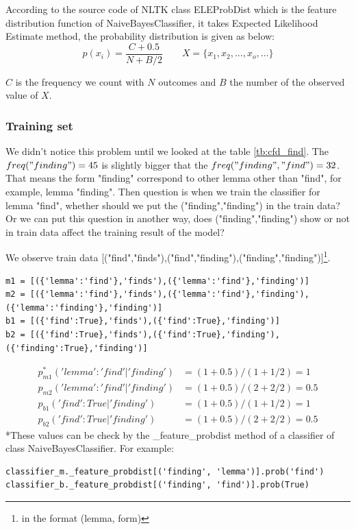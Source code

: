 \documentclass[a4paper]{article}
\begin{document}
According to the source code of NLTK class ELEProbDist which is the feature distribution function of NaiveBayesClassifier, it takes Expected Likelihood Estimate method, the probability distribution is given as below:\cite{loper_nltk.probability_nodate}
\begin{equation}
p(x_i)=\frac{C+0.5}{N+B/2} \qquad X = \{x_1,x_2,\dots,x_o,\dots\}
\end{equation}

$C$ is the frequency we count with $N$ outcomes and $B$ the number of the observed value of $X$. 




\subsubsection{Training set}

We didn't notice this problem until we looked at the table \ref{tb:cfd_find}. The $freq("finding")=45$ is slightly bigger that the $freq("finding","find")=32$. That means the form "finding" correspond to other lemma other than "find", for example, lemma "finding". Then question is when we train the classifier for lemma "find", whether should we put the ("finding","finding") in the train data? Or we can put this question in another way, does ("finding","finding") show or not in train data affect the training result of the model?

We observe train data [("find","finds"),("find","finding"),("finding","finding")]\footnote{in the format (lemma, form)}. 
\begin{lstlisting}
m1 = [({'lemma':'find'},'finds'),({'lemma':'find'},'finding')]
m2 = [({'lemma':'find'},'finds'),({'lemma':'find'},'finding'),({'lemma':'finding'},'finding')]
b1 = [({'find':True},'finds'),({'find':True},'finding')]
b2 = [({'find':True},'finds'),({'find':True},'finding'),({'finding':True},'finding')]
\end{lstlisting}
\begin{align*}
p_{m1}^*('lemma':'find'|'finding')&=(1+0.5)/(1+1/2)=1 \\
p_{m2}('lemma':'find'|'finding')&=(1+0.5)/(2+2/2)=0.5 \\
p_{b1}('find':True|'finding')&=(1+0.5)/(1+1/2)=1 \\
p_{b2}('find':True|'finding')&=(1+0.5)/(2+2/2)=0.5
\end{align*}
*These values can be check by the \_feature\_probdist method of a classifier of class NaiveBayesClassifier. For example:
\begin{lstlisting}
classifier_m._feature_probdist[('finding', 'lemma')].prob('find')
classifier_b._feature_probdist[('finding', 'find')].prob(True)
\end{lstlisting}
\end{document}
